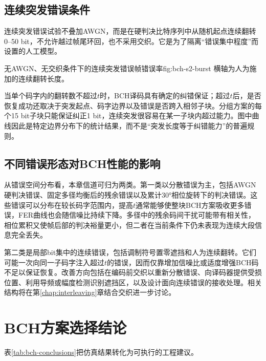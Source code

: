 \subsection{连续突发错误条件}

连续突发错误试验不叠加AWGN，而是在硬判决比特序列中从随机起点连续翻转0--50 bit，不允许越过帧尾环回，也不采用交织。它是为了隔离“错误集中程度”而设置的人工模型。

  {无AWGN、无交织条件下的连续突发错误帧错误率}{fig:bch-s2-burst}
  {横轴为人为施加的连续翻转长度。}

当单个码字内的翻转数不超过$t$时，BCH译码具有确定的纠错保证；超过$t$后，是否恢复成功还取决于突发起点、码字边界以及错误是否跨入相邻子块。分组方案的每个15 bit子块只能保证纠正1 bit，连续突发很容易在某一子块内超过能力。图中曲线因此是特定边界分布下的统计结果，而不是“突发长度等于纠错能力”的普遍规则。

\subsection{不同错误形态对BCH性能的影响}

从错误空间分布看，本章信道可归为两类。第一类以分散错误为主，包括AWGN硬判决错误、固定多径均衡后的残余错误以及累计30°相位旋转下的判决错误。这些错误可以分布在较长码字范围内，提高$t$通常能够使整块BCH方案吸收更多错误，FER曲线也会随信噪比持续下降。多径中的残余码间干扰可能带有相关性，相位累积又使帧后部的判决裕量更小，但二者在当前条件下仍未表现为连续大段信息完全丢失。

第二类是局部bit集中的连续错误，包括调制符号置零遮挡和人为连续翻转。它们可能一次向同一子码字注入超过$t$的错误，因而仅靠增加信噪比或适度增强BCH码不足以保证恢复。改善方向包括在编码前交织以重新分散错误、向译码器提供受损位置、利用导频或幅度检测识别遮挡区，以及设计面向连续错误的接收处理。相关结构将在第\ref{chap:interleaving}章结合交织进一步讨论。

\section{BCH方案选择结论}

表\ref{tab:bch-conclusions}把仿真结果转化为可执行的工程建议。

